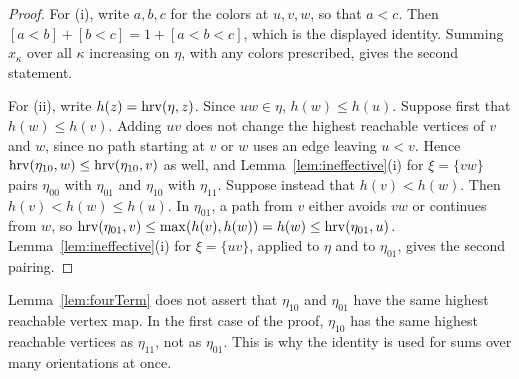 \begin{proof}
For (i), write $a,b,c$ for the colors at $u,v,w$, so that $a<c$.
Then $[a<b]+[b<c]=1+[a<b<c]$, which is the displayed identity.
Summing $x_\kappa$ over all $\kappa$ increasing on $\eta$, with any colors
prescribed, gives the second statement.

For (ii), write $h(z)=\operatorname{hrv}(\eta,z)$.
Since $uw\in\eta$, $h(w)\leq h(u)$.
Suppose first that $h(w)\leq h(v)$.
Adding $uv$ does not change the highest reachable vertices of $v$ and $w$, since
no path starting at $v$ or $w$ uses an edge leaving $u<v$.
Hence $\operatorname{hrv}(\eta_{10},w)\leq\operatorname{hrv}(\eta_{10},v)$ as well, and
Lemma~\ref{lem:ineffective}(i) for $\xi=\{vw\}$ pairs $\eta_{00}$ with $\eta_{01}$
and $\eta_{10}$ with $\eta_{11}$.
Suppose instead that $h(v)<h(w)$.
Then $h(v)<h(w)\leq h(u)$.
In $\eta_{01}$, a path from $v$ either avoids $vw$ or continues from $w$, so
$\operatorname{hrv}(\eta_{01},v)\leq\max(h(v),h(w))=h(w)\leq\operatorname{hrv}(\eta_{01},u)$.
Lemma~\ref{lem:ineffective}(i) for $\xi=\{uv\}$, applied to $\eta$ and to
$\eta_{01}$, gives the second pairing.
\end{proof}

Lemma~\ref{lem:fourTerm} does not assert that $\eta_{10}$ and $\eta_{01}$ have
the same highest reachable vertex map.
In the first case of the proof, $\eta_{10}$ has the same highest reachable
vertices as $\eta_{11}$, not as $\eta_{01}$.
This is why the identity is used for sums over many orientations at once.
